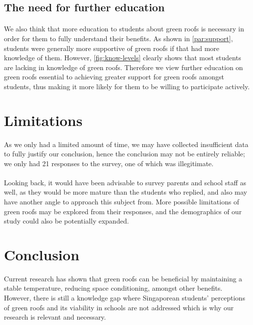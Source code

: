 \documentclass[a4paper]{article}
\begin{document}
\begin{multicols}{2}
  \subsection{The need for further education}
  \paragraph{} We also think that more education to students about
  green roofs is necessary in order for them to fully understand their
  benefits. As shown in \cref{par:support}, students were generally more
  supportive of green roofs if that had more knowledge of them. However,
  \cref{fig:know-levels} clearly shows that most students are lacking in
  knowledge of green roofs. Therefore we view further education on
  green roofs essential to achieving greater support for green roofs
  amongst students, thus making it more likely for them to be willing
  to participate actively.

  \section{Limitations}
  \paragraph{} As we only had a limited amount of time, we may have collected
  insufficient data to fully justify our conclusion, hence the conclusion may
  not be entirely reliable; we only had 21 responses to the survey, one of
  which was illegitimate.

  \paragraph{} Looking back, it would have been advisable to survey
  parents and school staff as well, as they would be more mature than the
  students who replied, and also may have another angle to approach this
  subject from. More possible limitations of green roofs may be explored
  from their responses, and the demographics of our study could also be
  potentially expanded.
  \section{Conclusion}
  \paragraph{} Current research has shown that green roofs can be
  beneficial by maintaining a stable temperature, reducing space
  conditioning, amongst other benefits. However, there is still
  a knowledge gap where Singaporean students' perceptions of green
  roofs and its viability in schools are not addressed which is why our
  research is relevant and necessary.


\end{multicols}
\end{document}

